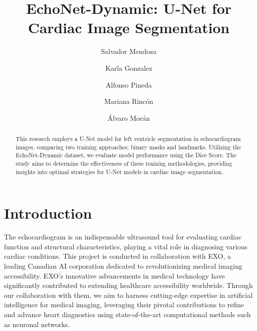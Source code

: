 \documentclass[runningheads]{llncs}
\begin{document}
%
\title{EchoNet-Dynamic: U-Net for Cardiac Image Segmentation}
%
%
    
\author{Salvador Mendoza \and
Karla Gonzalez \and
Alfonso Pineda \and
Mariana Rincón \and
Álvaro Morán}
%

%
%
\maketitle              %
%
\begin{abstract}
This research employs a U-Net model for left ventricle segmentation in echocardiogram images, comparing two training approaches: binary masks and landmarks. Utilizing the EchoNet-Dynamic dataset, we evaluate model performance using the Dice Score. The study aims to determine the effectiveness of these training methodologies, providing insights into optimal strategies for U-Net models in cardiac image segmentation.


\end{abstract}
%
%
%
\section{Introduction}
The echocardiogram is an indispensable ultrasound tool for evaluating cardiac function and structural characteristics, playing a vital role in diagnosing various cardiac conditions. This project is conducted in collaboration with EXO, a leading Canadian AI corporation dedicated to revolutionizing medical imaging accessibility. EXO's innovative advancements in medical technology have significantly contributed to extending healthcare accessibility worldwide. Through our collaboration with them, we aim to harness cutting-edge expertise in artificial intelligence for medical imaging, leveraging their pivotal contributions to refine and advance heart diagnostics using state-of-the-art computational methods such as neuronal networks.
\end{document}
